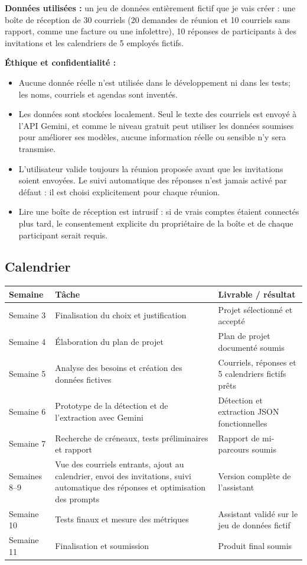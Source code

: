 \documentclass[11pt,letterpaper]{article}
\begin{document}
\textbf{Données utilisées :} un jeu de données entièrement fictif que je vais créer : une boîte de réception de 30 courriels (20 demandes de réunion et 10 courriels sans rapport, comme une facture ou une infolettre), 10 réponses de participants à des invitations et les calendriers de 5 employés fictifs.

\textbf{Éthique et confidentialité :}
\begin{itemize}
  \item Aucune donnée réelle n'est utilisée dans le développement ni dans les tests; les noms, courriels et agendas sont inventés.
  \item Les données sont stockées localement. Seul le texte des courriels est envoyé à l'API Gemini, et comme le niveau gratuit peut utiliser les données soumises pour améliorer ses modèles, aucune information réelle ou sensible n'y sera transmise.
  \item L'utilisateur valide toujours la réunion proposée avant que les invitations soient envoyées. Le suivi automatique des réponses n'est jamais activé par défaut : il est choisi explicitement pour chaque réunion.
  \item Lire une boîte de réception est intrusif : si de vrais comptes étaient connectés plus tard, le consentement explicite du propriétaire de la boîte et de chaque participant serait requis.
\end{itemize}

\subsection{Calendrier}

\begin{center}
\begin{tabularx}{\textwidth}{@{}lXX@{}}
\toprule
\textbf{Semaine} & \textbf{Tâche} & \textbf{Livrable / résultat} \\
\midrule
Semaine 3 & Finalisation du choix et justification & Projet sélectionné et accepté \\
Semaine 4 & Élaboration du plan de projet & Plan de projet documenté soumis \\
Semaine 5 & Analyse des besoins et création des données fictives & Courriels, réponses et 5 calendriers fictifs prêts \\
Semaine 6 & Prototype de la détection et de l'extraction avec Gemini & Détection et extraction JSON fonctionnelles \\
Semaine 7 & Recherche de créneaux, tests préliminaires et rapport & Rapport de mi-parcours soumis \\
Semaines 8--9 & Vue des courriels entrants, ajout au calendrier, envoi des invitations, suivi automatique des réponses et optimisation des prompts & Version complète de l'assistant \\
Semaine 10 & Tests finaux et mesure des métriques & Assistant validé sur le jeu de données fictif \\
Semaine 11 & Finalisation et soumission & Produit final soumis \\
\bottomrule
\end{tabularx}
\end{center}
\end{document}
